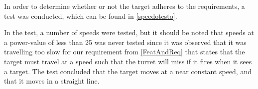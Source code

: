 In order to determine whether or not the target adheres to the requirements, a
test was conducted, which can be found in \autoref{speedotesto}.

In the test, a number of speeds were tested, but it should be noted that speeds
at a power-value of less than 25 was never tested since it was observed that it
was travelling too slow for our requirement from \autoref{FeatAndReq} that
states that the target must travel at a speed such that the turret will miss if
it fires when it sees a target.\nl
The test concluded that the target moves at a near constant speed, and that it
moves in a straight line.
